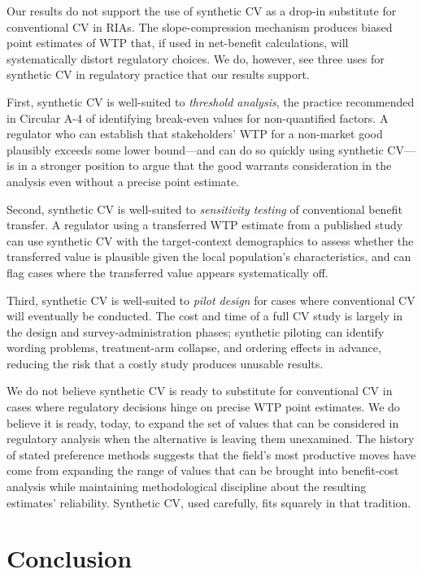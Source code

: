 \documentclass[12pt]{article}
\begin{document}
Our results do not support the use of synthetic CV as a drop-in substitute for conventional CV in RIAs. The slope-compression mechanism produces biased point estimates of WTP that, if used in net-benefit calculations, will systematically distort regulatory choices. We do, however, see three uses for synthetic CV in regulatory practice that our results support.

First, synthetic CV is well-suited to \emph{threshold analysis}, the practice recommended in Circular A-4 of identifying break-even values for non-quantified factors. A regulator who can establish that stakeholders' WTP for a non-market good plausibly exceeds some lower bound---and can do so quickly using synthetic CV---is in a stronger position to argue that the good warrants consideration in the analysis even without a precise point estimate.

Second, synthetic CV is well-suited to \emph{sensitivity testing} of conventional benefit transfer. A regulator using a transferred WTP estimate from a published study can use synthetic CV with the target-context demographics to assess whether the transferred value is plausible given the local population's characteristics, and can flag cases where the transferred value appears systematically off.

Third, synthetic CV is well-suited to \emph{pilot design} for cases where conventional CV will eventually be conducted. The cost and time of a full CV study is largely in the design and survey-administration phases; synthetic piloting can identify wording problems, treatment-arm collapse, and ordering effects in advance, reducing the risk that a costly study produces unusable results.

We do not believe synthetic CV is ready to substitute for conventional CV in cases where regulatory decisions hinge on precise WTP point estimates. We do believe it is ready, today, to expand the set of values that can be considered in regulatory analysis when the alternative is leaving them unexamined. The history of stated preference methods suggests that the field's most productive moves have come from expanding the range of values that can be brought into benefit-cost analysis while maintaining methodological discipline about the resulting estimates' reliability. Synthetic CV, used carefully, fits squarely in that tradition.

\section{Conclusion}
\end{document}
